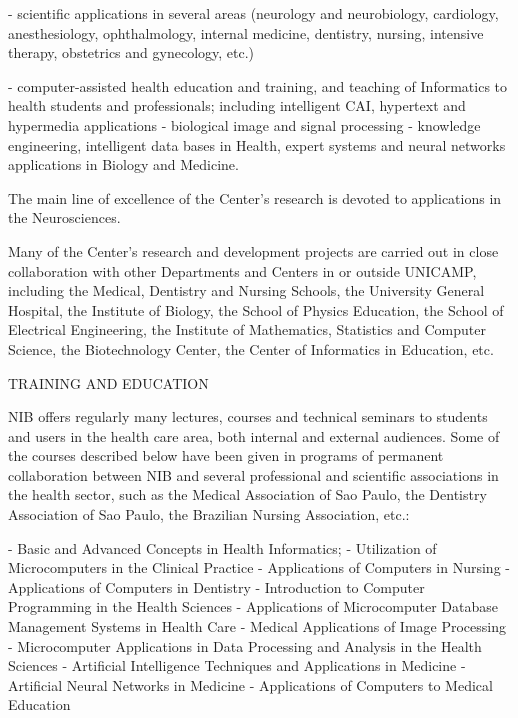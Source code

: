 - scientific applications in several areas
  (neurology and neurobiology, cardiology, anesthesiology,
  ophthalmology, internal medicine, dentistry, nursing,
  intensive therapy, obstetrics and gynecology, etc.)
 
- computer-assisted health education and training,
  and teaching of Informatics to health students and
  professionals; including intelligent CAI, hypertext and
  hypermedia applications
- biological image and signal processing
- knowledge engineering, intelligent data bases in
  Health, expert systems and neural networks applications in
  Biology and Medicine.
 
The main line of excellence of the Center's research is
devoted to applications in the Neurosciences.
 
Many of the Center's research and development projects are
carried out in close collaboration with other Departments
and Centers in or outside UNICAMP, including the Medical,
Dentistry and Nursing Schools, the University General
Hospital, the Institute of Biology, the School of Physics
Education, the School of Electrical Engineering, the
Institute of Mathematics, Statistics and Computer Science,
the Biotechnology Center, the Center of Informatics in
Education, etc.
 
TRAINING AND EDUCATION
 
NIB offers regularly many lectures, courses and technical
seminars to students and users in the health care area, both
internal and external audiences. Some of the courses
described below have been  given in programs of permanent
collaboration between NIB and several professional and
scientific associations in the health sector, such as the
Medical Association of Sao Paulo, the Dentistry Association
of Sao Paulo, the Brazilian Nursing Association, etc.:
 
- Basic and Advanced Concepts in Health Informatics;
- Utilization of Microcomputers in the Clinical Practice
- Applications of Computers in Nursing
- Applications of Computers in Dentistry
- Introduction to Computer Programming in the Health Sciences
- Applications of Microcomputer Database Management
  Systems in Health Care
- Medical Applications of Image Processing
- Microcomputer Applications in Data Processing and
  Analysis in the Health Sciences
- Artificial Intelligence Techniques and Applications in Medicine
- Artificial Neural Networks in Medicine
- Applications of Computers to Medical Education
 
